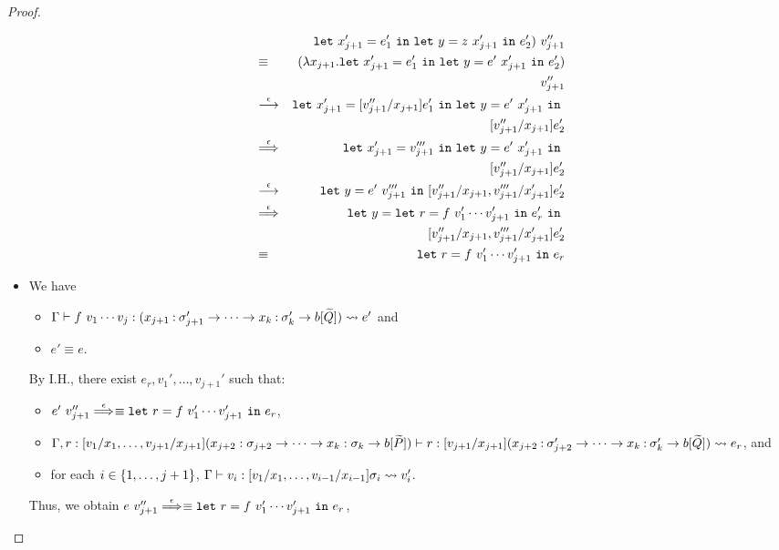 \begin{proof}
\begin{itemize}
\begin{eqnarray*}
&&\mathtt{let~}x_{j+1}'=e_1'\mathtt{~in~}\mathtt{let~}y=z\ x_{j+1}'\mathtt{~in~}e_2')\ v_{j+1}'' \\
&\equiv&(\lambda x_{j+1}.\mathtt{let~}x_{j+1}'=e_1'\mathtt{~in~}\mathtt{let~}y=e'\ x_{j+1}'\mathtt{~in~}e_2') \\
&&v_{j+1}'' \\
&\stackrel{\epsilon}{\longrightarrow}_{}& \mathtt{let~}x_{j+1}'=[v_{j+1}''/x_{j+1}]e_1'\mathtt{~in~}\mathtt{let~}y=e'\ x_{j+1}'\mathtt{~in~} \\
&&[v_{j+1}''/x_{j+1}]e_2' \\
&\stackrel{\epsilon}{\Longrightarrow}_{}& \mathtt{let~}x_{j+1}'=v_{j+1}'''\mathtt{~in~}\mathtt{let~}y=e'\ x_{j+1}'\mathtt{~in~} \\
&&[v_{j+1}''/x_{j+1}]e_2' \\
&\stackrel{\epsilon}{\longrightarrow}_{}& \mathtt{let~}y=e'\ v_{j+1}'''\mathtt{~in~}[v_{j+1}''/x_{j+1},v_{j+1}'''/x_{j+1}']e_2' \\
&\stackrel{\epsilon}{\Longrightarrow}_{}& \mathtt{let~}y=\mathtt{let~}r=f\ v_1'\cdots v_{j+1}'\mathtt{~in~}{e_r'}\mathtt{~in~} \\
&&[v_{j+1}''/x_{j+1},v_{j+1}'''/x_{j+1}']e_2' \\
&\equiv& \mathtt{let~}r=f\ v_1'\cdots v_{j+1}'\mathtt{~in~}{e_r}
\end{eqnarray*}

\item[] 
We have
\begin{itemize}
\item \(\Gamma \vdash f\ v_1\cdots v_j : (x_{j+1}\mathbin{:}\sigma_{j+1}' \to \cdots \to x_k\mathbin{:}\sigma_k' \to b[\widetilde{Q}]) \leadsto e'\) and
\item \(e' \equiv e\).
\end{itemize}
By I.H., there exist \(e_r,v_1',\dots,v_{j+1}'\) such that:
\begin{itemize}
\item \(e'\ v_{j+1}'' \stackrel{\epsilon}{\Longrightarrow}_{}\equiv \mathtt{let~}r=f\ v_1'\cdots v_{j+1}'\mathtt{~in~}{e_r}\),
\item
\(\Gamma,r:[v_1/x_1,\dots,v_{j+1}/x_{j+1}](x_{j+2}:\sigma_{j+2} \to \cdots \to x_k:\sigma_k \to b[\widetilde{P}]) \vdash r : [v_{j+1}/x_{j+1}](x_{j+2}\mathbin{:}\sigma_{j+2}' \to \cdots \to x_k\mathbin{:}\sigma_k' \to b[\widetilde{Q}]) \leadsto e_r\), and
\item for each \(i \in \{1,\dots,j+1\}\), \(\Gamma \vdash v_i : [v_1/x_1,\dots,v_{i-1}/x_{i-1}]\sigma_i \leadsto v_i'\).
\end{itemize}
Thus, we obtain \(e\ v_{j+1}'' \stackrel{\epsilon}{\Longrightarrow}_{}\equiv \mathtt{let~}r=f\ v_1'\cdots v_{j+1}'\mathtt{~in~}{e_r}\),
\end{itemize}
\end{proof}



